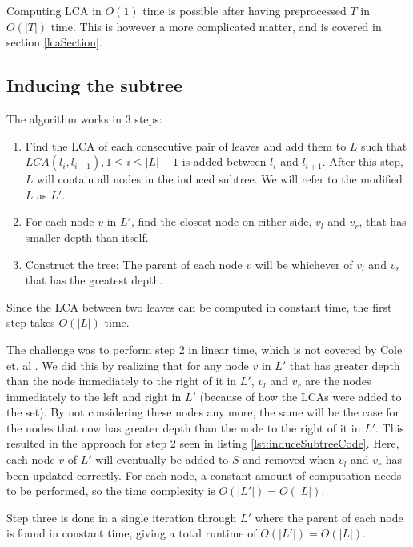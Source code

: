 Computing LCA in $O(1)$ time is possible after having preprocessed $T$ in $O(|T|)$ time. This is however a more complicated matter, and is covered in section \ref{lcaSection}.

\subsection{Inducing the subtree}
The algorithm works in 3 steps:
\begin{enumerate}
	\item Find the LCA of each consecutive pair of leaves and add them to $L$ such that $LCA(l_i,l_{i+1}), 1 \le i \le |L|-1$ is added between $l_i$ and $l_{i+1}$.
	\subitem After this step, $L$ will contain all nodes in the induced subtree.
	\subitem We will refer to the modified $L$ as $L'$.
	\item For each node $v$ in $L'$, find the closest node on either side, $v_l$ and $v_r$, that has smaller depth than itself.
	\item Construct the tree: The parent of each node $v$ will be whichever of $v_l$ and $v_r$ that has the greatest depth.
\end{enumerate}

Since the LCA between two leaves can be computed in constant time, the first step takes $O(|L|)$ time.

The challenge was to perform step 2 in linear time, which is not covered by Cole et. al \cite{nlogn}. We did this by realizing that for any node $v$ in $L'$ that has greater depth than the node immediately to the right of it in $L'$, $v_l$ and $v_r$ are the nodes immediately to the left and right in $L'$ (because of how the LCAs were added to the set). By not considering these nodes any more, the same will be the case for the nodes that now has greater depth than the node to the right of it in $L'$. This resulted in the approach for step 2 seen in listing \ref{lst:induceSubtreeCode}. Here, each node $v$ of $L'$ will eventually be added to $S$ and removed when $v_l$ and $v_r$ has been updated correctly. For each node, a constant amount of computation needs to be performed, so the time complexity is $O(|L'|) = O(|L|)$.

Step three is done in a single iteration through $L'$ where the parent of each node is found in constant time, giving a total runtime of $O(|L'|) = O(|L|)$.

